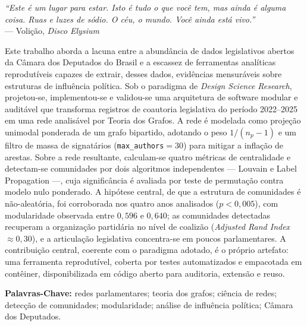 \documentclass[
      12pt,
      a4paper,
      openright,
      oneside,
      chapter=TITLE,
      section=TITLE,
      english,
      french,
      spanish,
      brazilian
    ]{abntex2}
\begin{document}
    \begin{epigrafe}
        \vspace*{\fill}
        \begin{flushright}
            \textit{``Este é um lugar para estar. Isto é tudo o que você tem, mas ainda é alguma coisa. Ruas e luzes de sódio. O céu, o mundo. Você ainda está vivo.''}\\
            \vspace*{0.3cm}
            --- Volição, \textit{Disco Elysium}
        \end{flushright}
    \end{epigrafe}
    
    \begin{resumo}

    Este trabalho aborda a lacuna entre a abundância de dados legislativos abertos da Câmara dos Deputados do Brasil e a escassez de ferramentas analíticas reprodutíveis capazes de extrair, desses dados, evidências mensuráveis sobre estruturas de influência política. Sob o paradigma de \textit{Design Science Research}, projetou-se, implementou-se e validou-se uma arquitetura de software modular e auditável que transforma registros de coautoria legislativa do período 2022--2025 em uma rede analisável por Teoria dos Grafos. A rede é modelada como projeção unimodal ponderada de um grafo bipartido, adotando o peso $1/(n_p-1)$ e um filtro de massa de signatários (\texttt{max\_authors}$=30$) para mitigar a inflação de arestas. Sobre a rede resultante, calculam-se quatro métricas de centralidade e detectam-se comunidades por dois algoritmos independentes --- Louvain e Label Propagation ---, cuja significância é avaliada por teste de permutação contra modelo nulo ponderado. A hipótese central, de que a estrutura de comunidades é não-aleatória, foi corroborada nos quatro anos analisados ($p<0{,}005$), com modularidade observada entre $0{,}596$ e $0{,}640$; as comunidades detectadas recuperam a organização partidária no nível de coalizão (\textit{Adjusted Rand Index} $\approx 0{,}30$), e a articulação legislativa concentra-se em poucos parlamentares. A contribuição central, coerente com o paradigma adotado, é o próprio artefato: uma ferramenta reprodutível, coberta por testes automatizados e empacotada em contêiner, disponibilizada em código aberto para auditoria, extensão e reuso.

        \vspace*{0.5cm}
        \noindent\textbf{{Palavras-Chave: }} redes parlamentares; teoria dos grafos; ciência de redes; detecção de comunidades; modularidade; análise de influência política; Câmara dos Deputados.
    \end{resumo}
    
\end{document}
